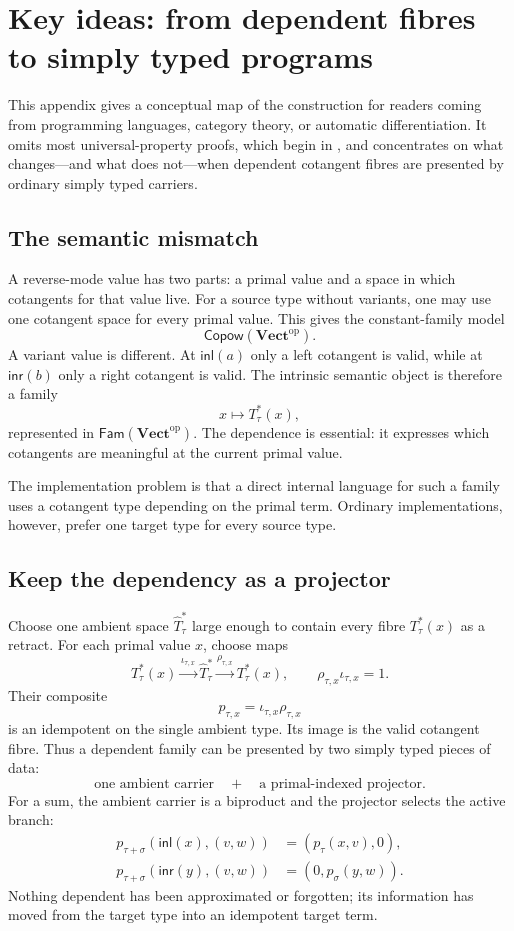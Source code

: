 \documentclass[runningheads,envcountsame]{llncs}
\newcommand{\Vectop}{\mathbf{Vect}^{\mathrm{op}}}
\newcommand{\Copow}{\mathsf{Copow}}
\newcommand{\Fam}{\mathsf{Fam}}
\begin{document}
\section{Key ideas: from dependent fibres to simply typed programs}
\label{app:key-ideas}

This appendix gives a conceptual map of the construction for readers coming from
programming languages, category theory, or automatic differentiation.  It omits
most universal-property proofs, which begin in , and concentrates
on what changes---and what does not---when dependent cotangent fibres are
presented by ordinary simply typed carriers.

\subsection{The semantic mismatch}

A reverse-mode value has two parts: a primal value and a space in which
cotangents for that value live.  For a source type without variants, one may use
one cotangent space for every primal value.  This gives the constant-family
model
$$
\Copow(\Vectop).
$$
A variant value is different.  At $\mathsf{inl}(a)$ only a left cotangent is
valid, while at $\mathsf{inr}(b)$ only a right cotangent is valid.  The intrinsic
semantic object is therefore a family
$$
x\longmapsto T^*_\tau(x),
$$
represented in $\Fam(\Vectop)$.  The dependence is essential: it expresses
which cotangents are meaningful at the current primal value.

The implementation problem is that a direct internal language for such a family
uses a cotangent type depending on the primal term.  Ordinary implementations,
however, prefer one target type for every source type.

\subsection{Keep the dependency as a projector}

Choose one ambient space $\widehat T^*_\tau$ large enough to contain every fibre
$T^*_\tau(x)$ as a retract.  For each primal value $x$, choose maps
$$
T^*_\tau(x)
\xrightarrow{\iota_{\tau,x}}
\widehat T^*_\tau
\xrightarrow{\rho_{\tau,x}}
T^*_\tau(x),
\qquad
\rho_{\tau,x}\iota_{\tau,x}=1.
$$
Their composite
$$
p_{\tau,x}=\iota_{\tau,x}\rho_{\tau,x}
$$
is an idempotent on the single ambient type.  Its image is the valid cotangent
fibre.  Thus a dependent family can be presented by two simply typed pieces of
data:
$$
\text{one ambient carrier}
\quad+\quad
\text{a primal-indexed projector}.
$$
For a sum, the ambient carrier is a biproduct and the projector selects the
active branch:
$$
\begin{aligned}
p_{\tau+\sigma}(\mathsf{inl}(x),(v,w))&=(p_\tau(x,v),0),\\
p_{\tau+\sigma}(\mathsf{inr}(y),(v,w))&=(0,p_\sigma(y,w)).
\end{aligned}
$$
Nothing dependent has been approximated or forgotten; its information has moved
from the target type into an idempotent target term.
\end{document}
